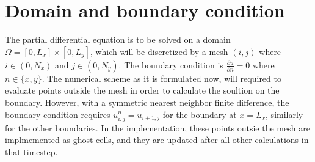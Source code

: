 \documentclass[a4paper]{article}
\begin{document}
\section{Domain and boundary condition}
The partial differential equation is to be solved on a domain $\Omega = [0, L_x] \times [0, L_y]$, which will be discretized by a mesh $(i, j)$ where $i \in (0, N_x)$ and $j \in (0, N_y)$.
The boundary condition is $\frac{\partial u}{\partial n} = 0$ where $n \in \{x, y\}$. The numerical scheme as it is formulated now, will required to evaluate points outside the mesh in order to calculate the soultion on the boundary. However, with a symmetric nearest neighbor finite difference, the boundary condition requires $u_{i, j}^n = u_{i+1, j}$ for the boundary at $x = L_x$, similarly for the other boundaries.
In the implementation, these points outsie the mesh are implmemented as ghost cells, and they are updated after all other calculations in that timestep.
\end{document}
